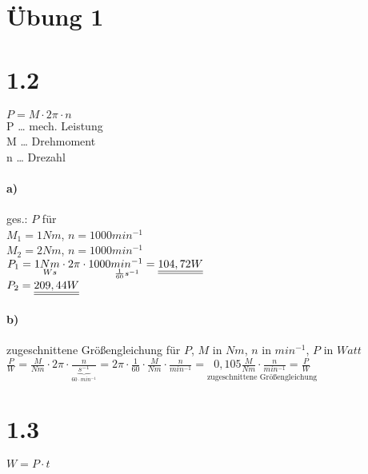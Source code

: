 






\maketitle
\newpage
\tableofcontents
\newpage

\section{Übung 1}

\section*{1.2}

$\boxed{P=M\cdot 2\pi \cdot n}$\\
P … mech. Leistung\\
M … Drehmoment\\
n … Drezahl
\paragraph{a)} ges.: $P$ für\\
$M_1= 1Nm$, $n=1000 min^{-1}$\\
$M_2= 2Nm$, $n=1000 min^{-1}$\vspace*{1em}\\
$P_1=1\underset{Ws}{Nm} \cdot 2\pi \cdot 1000 \underset{\frac{1}{60}s^{-1}}{min^{-1}}=\underline{\underline{104,72W}}$\\
$P_2=\underline{\underline{209,44W}}$

\paragraph{b)} zugeschnittene Größengleichung für $P$, $M$ in $Nm$, $n$ in $min^{-1}$, $P$ in $Watt$\\
$\frac{P}{W}=\frac{M}{Nm} \cdot 2 \pi \cdot \frac{n}{\underbrace{s^{-1}}_{60\cdot min^{-1}}}=2\pi \cdot \frac{1}{60} \cdot \frac{M}{Nm} \cdot \frac{n}{min^{-1}}=\underset{\text{zugeschnittene Größengleichung}}{\boxed{0,105\frac{M}{Nm}\cdot \frac{n}{min^{-1}}=\frac{P}{W}}}$

\section*{1.3}
$\boxed{W=P\cdot t}$
